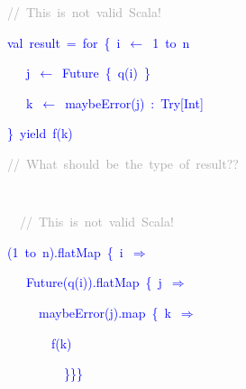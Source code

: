 {\footnotesize{}\vspace{-0.35cm}}\texttt{\textcolor{blue}{\footnotesize{}}}%
\begin{minipage}[t]{0.49\columnwidth}%
\begin{lyxcode}
\textcolor{darkgray}{\footnotesize{}//~This~is~not~valid~Scala!}{\footnotesize\par}

\textcolor{blue}{\footnotesize{}val~result~=~for~\{~i~$\leftarrow$~1~to~n}{\footnotesize\par}

\textcolor{blue}{\footnotesize{}~~~j~$\leftarrow$~Future~\{~q(i)~\}}{\footnotesize\par}

\textcolor{blue}{\footnotesize{}~~~k~$\leftarrow$~maybeError(j)~:~Try{[}Int{]}}{\footnotesize\par}

\textcolor{blue}{\footnotesize{}\}~yield~f(k)}{\footnotesize\par}

\textcolor{darkgray}{\footnotesize{}//~What~should~be~the~type~of~result??}{\footnotesize\par}
\end{lyxcode}
%
\end{minipage}\texttt{\textcolor{blue}{\footnotesize{}~ ~ ~}}%
\begin{minipage}[t]{0.49\columnwidth}%
\begin{lyxcode}
\textcolor{blue}{\footnotesize{}~~}\textcolor{darkgray}{\footnotesize{}//~This~is~not~valid~Scala!}{\footnotesize\par}

\textcolor{blue}{\footnotesize{}(1~to~n).flatMap~\{~i~$\Rightarrow$}{\footnotesize\par}

\textcolor{blue}{\footnotesize{}~~~Future(q(i)).flatMap~\{~j~$\Rightarrow$}{\footnotesize\par}

\textcolor{blue}{\footnotesize{}~~~~~maybeError(j).map~\{~k~$\Rightarrow$}{\footnotesize\par}

\textcolor{blue}{\footnotesize{}~~~~~~~f(k)}{\footnotesize\par}

\textcolor{blue}{\footnotesize{}~~~~~~~~~\}\}\}}{\footnotesize\par}
\end{lyxcode}
%
\end{minipage}\texttt{\textcolor{blue}{\footnotesize{}\medskip{}
}}{\footnotesize\par}

